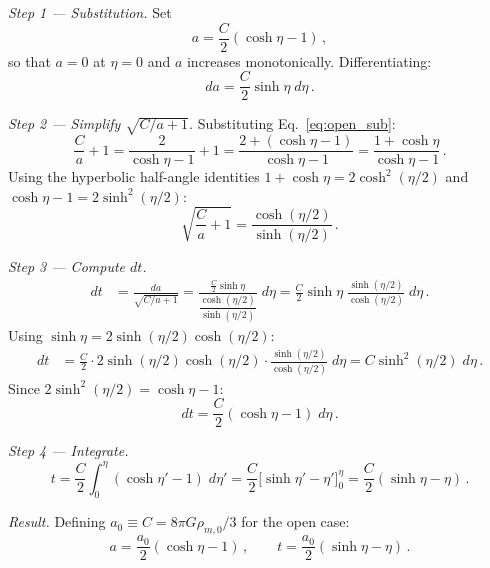 \medskip\noindent\emph{Step 1 --- Substitution.} Set
\begin{equation}\label{eq:open_sub}
    a = \frac{C}{2}(\cosh\eta - 1)\,,
\end{equation}
so that $a=0$ at $\eta=0$ and $a$ increases monotonically. Differentiating:
\begin{equation}
    da = \frac{C}{2}\sinh\eta\;d\eta\,.
\end{equation}

\medskip\noindent\emph{Step 2 --- Simplify $\sqrt{C/a+1}$.} Substituting Eq.~\eqref{eq:open_sub}:
\begin{equation}
    \frac{C}{a}+1 = \frac{2}{\cosh\eta-1}+1 = \frac{2+(\cosh\eta-1)}{\cosh\eta-1} = \frac{1+\cosh\eta}{\cosh\eta-1}\,.
\end{equation}
Using the hyperbolic half-angle identities $1+\cosh\eta = 2\cosh^2(\eta/2)$ and $\cosh\eta-1=2\sinh^2(\eta/2)$:
\begin{equation}
    \sqrt{\frac{C}{a}+1} = \frac{\cosh(\eta/2)}{\sinh(\eta/2)}\,.
\end{equation}

\medskip\noindent\emph{Step 3 --- Compute $dt$.}
\begin{align}
    dt &= \frac{da}{\sqrt{C/a+1}}
    = \frac{\frac{C}{2}\sinh\eta}{\dfrac{\cosh(\eta/2)}{\sinh(\eta/2)}}\;d\eta
    = \frac{C}{2}\sinh\eta\;\frac{\sinh(\eta/2)}{\cosh(\eta/2)}\;d\eta\,.
\end{align}
Using $\sinh\eta = 2\sinh(\eta/2)\cosh(\eta/2)$:
\begin{align}
    dt &= \frac{C}{2}\cdot 2\sinh(\eta/2)\cosh(\eta/2)\cdot\frac{\sinh(\eta/2)}{\cosh(\eta/2)}\;d\eta
    = C\sinh^2(\eta/2)\;d\eta\,.
\end{align}
Since $2\sinh^2(\eta/2) = \cosh\eta-1$:
\begin{equation}
    dt = \frac{C}{2}(\cosh\eta-1)\;d\eta\,.
\end{equation}

\medskip\noindent\emph{Step 4 --- Integrate.}
\begin{equation}
    t = \frac{C}{2}\int_0^{\eta}(\cosh\eta'-1)\;d\eta' = \frac{C}{2}\bigl[\sinh\eta'-\eta'\bigr]_0^{\eta} = \frac{C}{2}(\sinh\eta-\eta)\,.
\end{equation}

\medskip\noindent\emph{Result.} Defining $a_0\equiv C = 8\pi G\rho_{m,0}/3$ for the open case:
\begin{equation}
\boxed{
    a = \frac{a_0}{2}(\cosh\eta-1)\,,\qquad
    t = \frac{a_0}{2}(\sinh\eta-\eta)\,.}
    \label{eq:hyperbolic}
\end{equation}

